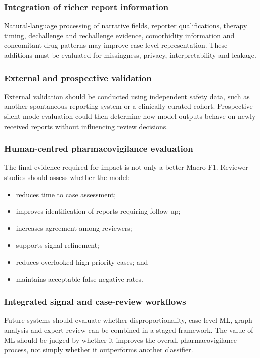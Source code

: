 \documentclass[10pt]{article}
\begin{document}
\subsubsection{Integration of richer report information}
Natural-language processing of narrative fields, reporter qualifications, therapy timing, dechallenge and rechallenge evidence, comorbidity information and concomitant drug patterns may improve case-level representation. These additions must be evaluated for missingness, privacy, interpretability and leakage.

\subsubsection{External and prospective validation}
External validation should be conducted using independent safety data, such as another spontaneous-reporting system or a clinically curated cohort. Prospective silent-mode evaluation could then determine how model outputs behave on newly received reports without influencing review decisions.

\subsubsection{Human-centred pharmacovigilance evaluation}
The final evidence required for impact is not only a better Macro-F1. Reviewer studies should assess whether the model:
\begin{itemize}
\item reduces time to case assessment;
\item improves identification of reports requiring follow-up;
\item increases agreement among reviewers;
\item supports signal refinement;
\item reduces overlooked high-priority cases; and
\item maintains acceptable false-negative rates.
\end{itemize}

\subsubsection{Integrated signal and case-review workflows}
Future systems should evaluate whether disproportionality, case-level ML, graph analysis and expert review can be combined in a staged framework. The value of ML should be judged by whether it improves the overall pharmacovigilance process, not simply whether it outperforms another classifier.
\end{document}
